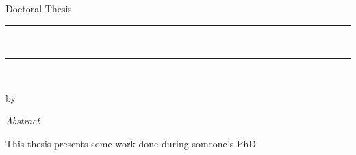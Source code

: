 
\thispagestyle{empty}




        \begin{center}
        	\bigskip
            {\normalsize \href{http://www.sussex.ac.uk/}{\myUni} \par} %
            {\normalsize \myFaculty \par} %
            {\normalsize \myDepartment \par} %
            \bigskip\vspace*{.02\textheight}
            {\Large Doctoral Thesis}\par
            \bigskip%
            
            {\rule{\linewidth}{1pt}\\%
            \Large \myTitle \par} %
            \rule{\linewidth}{1pt}\\[0.4cm]
            
            \bigskip
			{\normalsize by \myName \par} %
            \bigskip\vspace*{.06\textheight}
            {\Huge\textit{Abstract} \par}
            \bigskip

        \end{center}

        \noindent This thesis presents some work done during someone's PhD